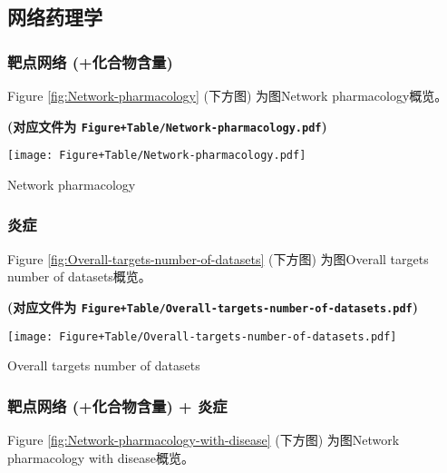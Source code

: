 \documentclass[
]{article}
\begin{document}
\hypertarget{ux7f51ux7edcux836fux7406ux5b66}{%
\subsection{网络药理学}\label{ux7f51ux7edcux836fux7406ux5b66}}

\hypertarget{ux9776ux70b9ux7f51ux7edc-ux5316ux5408ux7269ux542bux91cf}{%
\subsubsection{靶点网络 (+化合物含量)}\label{ux9776ux70b9ux7f51ux7edc-ux5316ux5408ux7269ux542bux91cf}}

Figure \ref{fig:Network-pharmacology} (下方图) 为图Network pharmacology概览。

\textbf{(对应文件为 \texttt{Figure+Table/Network-pharmacology.pdf})}

\def\@captype{figure}
\begin{center}
\texttt{[image: Figure+Table/Network-pharmacology.pdf]}
\caption{Network pharmacology}\label{fig:Network-pharmacology}
\end{center}

\hypertarget{ux708eux75c7}{%
\subsubsection{炎症}\label{ux708eux75c7}}

Figure \ref{fig:Overall-targets-number-of-datasets} (下方图) 为图Overall targets number of datasets概览。

\textbf{(对应文件为 \texttt{Figure+Table/Overall-targets-number-of-datasets.pdf})}

\def\@captype{figure}
\begin{center}
\texttt{[image: Figure+Table/Overall-targets-number-of-datasets.pdf]}
\caption{Overall targets number of datasets}\label{fig:Overall-targets-number-of-datasets}
\end{center}

\hypertarget{ux9776ux70b9ux7f51ux7edc-ux5316ux5408ux7269ux542bux91cf-ux708eux75c7}{%
\subsubsection{靶点网络 (+化合物含量) + 炎症}\label{ux9776ux70b9ux7f51ux7edc-ux5316ux5408ux7269ux542bux91cf-ux708eux75c7}}

Figure \ref{fig:Network-pharmacology-with-disease} (下方图) 为图Network pharmacology with disease概览。
\end{document}
